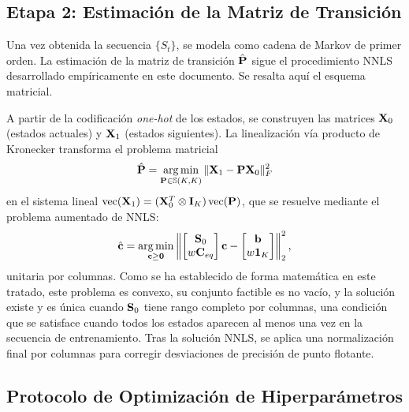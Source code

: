 \subsection{Etapa 2: Estimación de la Matriz de Transición}
\label{subsec:etapa2_estimacion}

Una vez obtenida la secuencia $\{S_t\}$, se modela como cadena de
Markov de primer orden.  La estimación de la matriz de transición
$\hat{\mathbf{P}}$ sigue el procedimiento NNLS desarrollado empíricamente
en este documento.  Se resalta aquí el esquema matricial.

A partir de la codificación \textit{one-hot} de los estados, se
construyen las matrices $\mathbf{X}_0$ (estados actuales) y $\mathbf{X}_1$
(estados siguientes).  La linealización vía producto de Kronecker
transforma el problema matricial
\begin{equation}
    \hat{\mathbf{P}} = \operatorname*{arg\,min}_{\mathbf{P} \in \mathbb{S}(K,K)}
    \|\mathbf{X}_1 - \mathbf{P}\mathbf{X}_0\|_F^2
    \label{eq:frobenius_combustibles}
\end{equation}
en el sistema lineal $\text{vec}(\mathbf{X}_1) = (\mathbf{X}_0^T \otimes \mathbf{I}_K)\,\text{vec}(\mathbf{P})$, 
que se resuelve mediante el problema aumentado de NNLS:
\begin{equation}
    \hat{\mathbf{c}} = \operatorname*{arg\,min}_{\mathbf{c} \ge \mathbf{0}}
    \left\| \begin{bmatrix} \mathbf{S}_0 \\ w\mathbf{C}_{eq}
    \end{bmatrix} \mathbf{c} - \begin{bmatrix} \mathbf{b} \\
    w\mathbf{1}_K \end{bmatrix} \right\|_2^2,
    \label{eq:nnls_aumentado_combustibles}
\end{equation}
unitaria por columnas. Como se ha establecido de forma matemática en
este tratado, este problema es convexo, su conjunto factible es no vacío, y la solución existe y es única
cuando $\mathbf{S}_0$ tiene rango completo por columnas, una condición
que se satisface cuando todos los estados aparecen al menos una vez
en la secuencia de entrenamiento.  Tras la solución NNLS, se aplica
una normalización final por columnas para corregir desviaciones de
precisión de punto flotante.

\subsection{Protocolo de Optimización de Hiperparámetros}
\label{subsec:protocolo_optimizacion}

